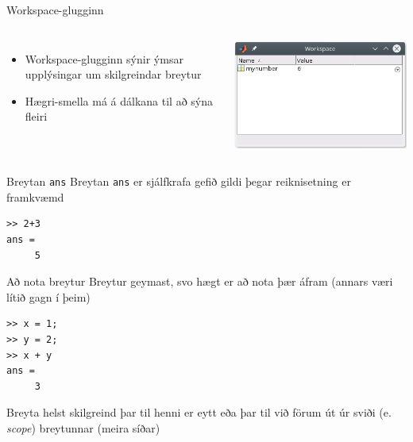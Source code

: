 \documentclass[handout]{beamer}
\begin{document}
\begin{frame}{Workspace-glugginn}
\begin{columns}
\begin{itemize}
 \item Workspace-glugginn sýnir ýmsar upplýsingar um skilgreindar breytur
 \item Hægri-smella má á dálkana til að sýna fleiri
\end{itemize}
\includegraphics[width=\linewidth]{Pics/workspace-window}
\end{columns}
\end{frame}

\begin{frame}[fragile]{Breytan \texttt{ans}}
Breytan \texttt{ans} er sjálfkrafa gefið gildi þegar reiknisetning er framkvæmd 
\begin{verbatim}
>> 2+3
ans = 
     5
\end{verbatim}
\end{frame}

\begin{frame}[fragile]{Að nota breytur}
Breytur geymast, svo hægt er að nota þær áfram (annars væri lítið gagn í þeim)
\begin{verbatim}
>> x = 1;
>> y = 2;
>> x + y
ans =
     3
\end{verbatim}
Breyta helst skilgreind þar til henni er eytt eða þar til við förum út úr sviði (e. \emph{scope}) breytunnar (meira síðar)
\end{frame}
\end{document}
